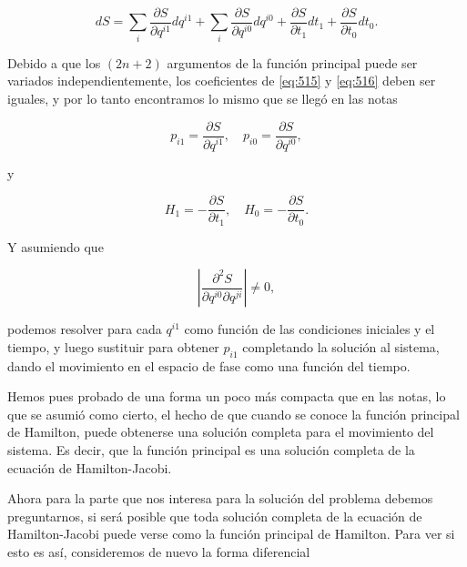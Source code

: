 \documentclass[a4paper,10pt]{article}
\numberwithin{equation}{section}
\begin{document}
\begin{equation}
 dS = \sum_i \frac{\partial S}{\partial q^{i1}}dq^{i1} + 
 \sum_i \frac{\partial S}{\partial q^{i0}}dq^{i0} + 
 \frac{\partial S}{\partial t_1}dt_1 + 
 \frac{\partial S}{\partial t_0}dt_0.
 \label{eq:516}
\end{equation}

Debido a que los $(2n + 2)$ argumentos de la función principal puede 
ser variados independientemente, los coeficientes de \eqref{eq:515} y 
\eqref{eq:516} deben ser iguales, y por lo tanto encontramos lo 
mismo que se llegó en las notas 

\begin{equation}
 p_{i1} = \frac{\partial S}{\partial q^{i1}}, \quad 
 p_{i0} = \frac{\partial S}{\partial q^{i0}},
\end{equation}

y

\begin{equation}
 H_1 = - \frac{\partial S}{\partial t_1}, \quad 
 H_0 = - \frac{\partial S}{\partial t_0}.
\end{equation}

Y asumiendo que 

\begin{equation}
 \left|\frac{\partial^2 S}{\partial q^{i0}\partial q^{ji}} \right| 
 \ne 0,
\end{equation}

podemos resolver para cada $q^{i1}$ como función de las condiciones 
iniciales y el tiempo, y luego sustituir para obtener $p_{i1}$ 
completando la solución al sistema, dando el movimiento en el espacio 
de fase como una función del tiempo. 

\vspace{.3cm}

Hemos pues probado de una forma un poco más compacta que en las notas, 
lo que se asumió como cierto, el hecho de que cuando se conoce la 
función principal de Hamilton, puede obtenerse una solución completa 
para el movimiento del sistema. Es decir, que la función principal 
es una solución completa de la ecuación de Hamilton-Jacobi.

\vspace{.3cm}

Ahora para la parte que nos interesa para la solución del problema debemos 
preguntarnos, si será posible que toda solución completa de la ecuación de 
Hamilton-Jacobi puede verse como la función principal de Hamilton. Para 
ver si esto es así, consideremos de nuevo la forma diferencial 
\end{document}
